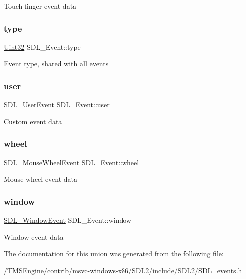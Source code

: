 Touch finger event data \mbox{\label{union_s_d_l___event_a237648bec242d2d5835f1a4250ddfa46}} 
\subsubsection{\texorpdfstring{type}{type}}
{\footnotesize\ttfamily \hyperlink{_s_d_l__stdinc_8h_add440eff171ea5f55cb00c4a9ab8672d}{Uint32} S\+D\+L\+\_\+\+Event\+::type}

Event type, shared with all events \mbox{\label{union_s_d_l___event_ab7c394e3ce7bf1e4f8d68bc0e9f1b042}} 
\subsubsection{\texorpdfstring{user}{user}}
{\footnotesize\ttfamily \hyperlink{struct_s_d_l___user_event}{S\+D\+L\+\_\+\+User\+Event} S\+D\+L\+\_\+\+Event\+::user}

Custom event data \mbox{\label{union_s_d_l___event_a267d3f550715519ec90a81ccd0e6cbda}} 
\subsubsection{\texorpdfstring{wheel}{wheel}}
{\footnotesize\ttfamily \hyperlink{struct_s_d_l___mouse_wheel_event}{S\+D\+L\+\_\+\+Mouse\+Wheel\+Event} S\+D\+L\+\_\+\+Event\+::wheel}

Mouse wheel event data \mbox{\label{union_s_d_l___event_a826936b3275406d857bc6654669fae71}} 
\subsubsection{\texorpdfstring{window}{window}}
{\footnotesize\ttfamily \hyperlink{struct_s_d_l___window_event}{S\+D\+L\+\_\+\+Window\+Event} S\+D\+L\+\_\+\+Event\+::window}

Window event data 

The documentation for this union was generated from the following file\+:\begin{DoxyCompactItemize}
\item 
/\+T\+M\+S\+Engine/contrib/msvc-\/windows-\/x86/\+S\+D\+L2/include/\+S\+D\+L2/\hyperlink{_s_d_l__events_8h}{S\+D\+L\+\_\+events.\+h}\end{DoxyCompactItemize}
